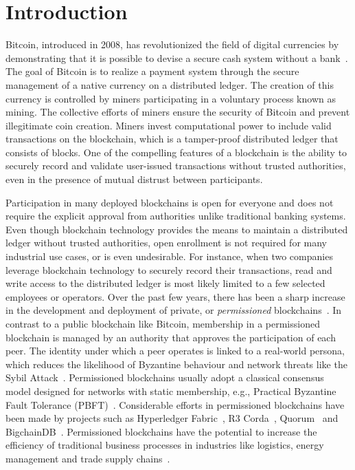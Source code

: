 \section{Introduction}
Bitcoin, introduced in 2008, has revolutionized the field of digital currencies by demonstrating that it is possible to devise a secure cash system without a bank~\cite{nakamoto2008bitcoin}.
The goal of Bitcoin is to realize a payment system through the secure management of a native currency on a distributed ledger.
The creation of this currency is controlled by miners participating in a voluntary process known as mining.
The collective efforts of miners ensure the security of Bitcoin and prevent illegitimate coin creation.
Miners invest computational power to include valid transactions on the blockchain, which is a tamper-proof distributed ledger that consists of blocks.
One of the compelling features of a blockchain is the ability to securely record and validate user-issued transactions without trusted authorities, even in the presence of mutual distrust between participants.

Participation in many deployed blockchains is open for everyone and does not require the explicit approval from authorities unlike traditional banking systems.
Even though blockchain technology provides the means to maintain a distributed ledger without trusted authorities, open enrollment is not required for many industrial use cases, or is even undesirable.
For instance, when two companies leverage blockchain technology to securely record their transactions, read and write access to the distributed ledger is most likely limited to a few selected employees or operators.
Over the past few years, there has been a sharp increase in the development and deployment of private, or \emph{permissioned} blockchains~\cite{androulaki2018hyperledger,de2018pbft,vukolic2017rethinking}.
In contrast to a public blockchain like Bitcoin, membership in a permissioned blockchain is managed by an authority that approves the participation of each peer.
The identity under which a peer operates is linked to a real-world persona, which reduces the likelihood of Byzantine behaviour and network threats like the Sybil Attack~\cite{douceur2002sybil}.
Permissioned blockchains usually adopt a classical consensus model designed for networks with static membership, e.g., Practical Byzantine Fault Tolerance (PBFT)~\cite{castro1999practical}.
Considerable efforts in permissioned blockchains have been made by projects such as Hyperledger Fabric~\cite{androulaki2018hyperledger}, R3 Corda~\cite{brown2016introducing}, Quorum~\cite{mogan2018quorum} and BigchainDB~\cite{mcconaghy2016bigchaindb}.
Permissioned blockchains have the potential to increase the efficiency of traditional business processes in industries like logistics, energy management and trade supply chains~\cite{vukolic2017rethinking}.

